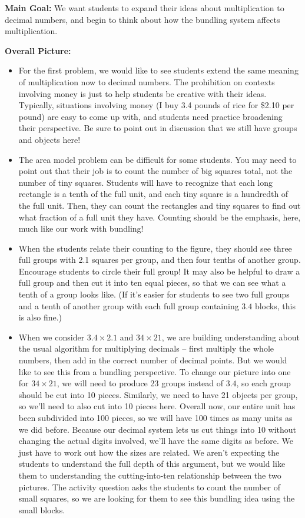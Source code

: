 \documentclass{ximera}
\begin{document}
\newpage

\begin{instructorNotes}

{\bf Main Goal:} We want students to expand their ideas about multiplication to decimal numbers, and begin to think about how the bundling system affects multiplication.

{\bf Overall Picture:}
\begin{itemize}
	\item For the first problem, we would like to see students extend the same meaning of multiplication now to decimal numbers. The prohibition on contexts involving money is just to help students be creative with their ideas. Typically, situations involving money (I buy 3.4 pounds of rice for \$2.10 per pound) are easy to come up with, and students need practice broadening their perspective. Be sure to point out in discussion that we still have groups and objects here!
	\item The area model problem can be difficult for some students. You may need to point out that their job is to count the number of big squares total, not the number of tiny squares. Students will have to recognize that each long rectangle is a tenth of the full unit, and each tiny square is a hundredth of the full unit. Then, they can count the rectangles and tiny squares to find out what fraction of a full unit they have. Counting should be the emphasis, here, much like our work with bundling!
	\item When the students relate their counting to the figure, they should see three full groups with 2.1 squares per group, and then four tenths of another group. Encourage students to circle their full group! It may also be helpful to draw a full group and then cut it into ten equal pieces, so that we can see what a tenth of a group looks like. (If it's easier for students to see two full groups and a tenth of another group with each full group containing $3.4$ blocks, this is also fine.)
	\item When we consider $3.4 \times 2.1$ and $34 \times 21$, we are building understanding about the usual algorithm for multiplying decimals -- first multiply the whole numbers, then add in the correct number of decimal points. But we would like to see this from a bundling perspective. To change our picture into one for $34 \times 21$, we will need to produce 23 groups instead of $3.4$, so each group should be cut into 10 pieces. Similarly, we need to have 21 objects per group, so we'll need to also cut into 10 pieces here. Overall now, our entire unit has been subdivided into 100 pieces, so we will have 100 times as many units as we did before. Because our decimal system lets us cut things into 10 without changing the actual digits involved, we'll have the same digits as before. We just have to work out how the sizes are related. We aren't expecting the students to understand the full depth of this argument, but we would like them to understanding the cutting-into-ten relationship between the two pictures. The activity question asks the students to count the number of small squares, so we are looking for them to see this bundling idea using the small blocks.

\end{itemize}
\end{instructorNotes}
\end{document}
